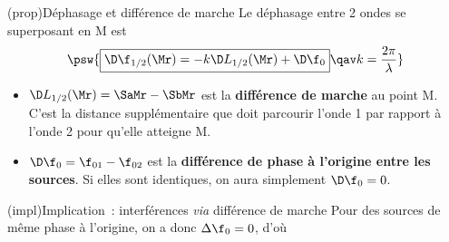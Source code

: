 \documentclass[../../main/main.tex]{subfiles}
\begin{document}
\begin{tcb}(prop){Déphasage et différence de marche}
	Le déphasage entre 2 ondes se superposant en M est
	\[
		\psw{
			\boxed{\D\f_{1/2}(\Mr) = -k\D L_{1/2}(\Mr) + \D\f_0}
			\qav k=\frac{2\pi}{\lambda}
		}
	\]
	\begin{itemize}
		\item $\D L_{1/2}(\Mr) = \SaMr - \SbMr$ est la \textbf{différence de
			      marche} au point M. C'est la distance supplémentaire que doit
		      parcourir l'onde 1 par rapport à l'onde 2 pour qu'elle atteigne M.
		\item $\D\f_0 = \f_{01}-\f_{02}$ est la \textbf{différence de phase à
			      l'origine entre les sources}. Si elles sont identiques, on aura
		      simplement $\D\f_0 = 0$.
	\end{itemize}
\end{tcb}

\begin{tcb}(impl){Implication~: interférences \textit{via} différence de marche}
	Pour des sources de même phase à l'origine, on a donc $\Delta\f_0 = 0$, d'où
	\smallbreak
	\begin{isd}[sidebyside align=top]
		\vspace{-15pt}
		\vspace{-15pt}
		\tcblower
		\vspace{-15pt}
		\vspace{-15pt}
	\end{isd}
\end{tcb}
\end{document}
